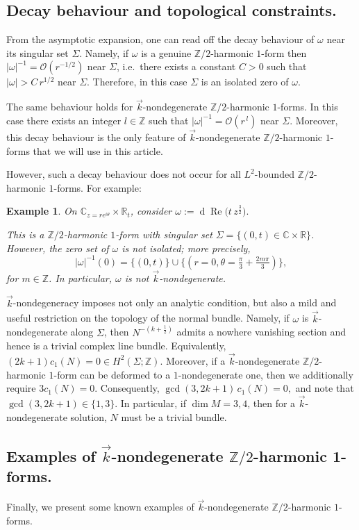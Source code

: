 \documentclass[11pt]{amsart}
\newcommand{\Z}{\mathbb{Z}}
\newcommand{\C}{\mathbb{C}}
\newcommand{\ZT}{\mathbb{Z}/2}
\renewcommand{\d}{\operatorname{d}}
\renewcommand{\O}{\mathcal{O}}
\renewcommand{\Re}{\operatorname{Re}}
\newtheorem{example}[theorem]{Example}
\newcommand{\mbR}{\mathbb{R}}
\begin{document}
\subsection{Decay behaviour and topological constraints.}
From the asymptotic expansion, one can read off the decay behaviour of $\omega$ near its singular set
$\Sigma$. Namely, if $\omega$ is a genuine $\ZT$-harmonic $1$-form then $|\omega|^{-1}=\O(r^{-1/2})$
near $\Sigma$, i.e.\ there exists a constant $C>0$ such that $|\omega|>C\,r^{1/2}$ near $\Sigma$.
Therefore, in this case $\Sigma$ is an isolated zero of $\omega$.

The same behaviour holds for $\vec{k}$-nondegenerate $\ZT$-harmonic $1$-forms. In this case there
exists an integer $l\in\Z$ such that $|\omega|^{-1}=\O(r^{\,l})$ near $\Sigma$. Moreover, this decay
behaviour is the only feature of $\vec{k}$-nondegenerate $\ZT$-harmonic $1$-forms that we will use in
this article.

However, such a decay behaviour does not occur for all $L^2$-bounded $\ZT$-harmonic $1$-forms. For
example:

\begin{example}
	On $\C_{z=re^{i\theta}}\times \mbR_t$, consider $\omega := \d\Re\bigl(t\,z^{\frac32}\bigr).$
	
	This is a $\ZT$-harmonic $1$-form with singular set $\Sigma=\{(0,t)\in \C\times \mbR\}$. However,
	the zero set of $\omega$ is not isolated; more precisely,
	\[
	|\omega|^{-1}(0)=\{(0,t)\}\cup \{(r=0,\theta=\tfrac{\pi}{3}+\tfrac{2m\pi}{3})\},
	\]
	for $m\in \Z$. In particular, $\omega$ is not $\vec{k}$-nondegenerate.
\end{example}

$\vec{k}$-nondegeneracy imposes not only an analytic condition, but also a mild and useful
restriction on the topology of the normal bundle. Namely, if $\omega$ is $\vec{k}$-nondegenerate
along $\Sigma$, then $N^{-(k+\frac12)}$ admits a nowhere vanishing section and hence is a trivial
complex line bundle. Equivalently, $(2k+1)c_1(N)=0\in H^2(\Sigma;\Z).$
Moreover, if a $\vec{k}$-nondegenerate $\ZT$-harmonic $1$-form can be deformed to a
$1$-nondegenerate one, then we additionally require $3c_1(N)=0$. Consequently, $\gcd(3,2k+1)\,c_1(N)=0,$
and note that $\gcd(3,2k+1)\in\{1,3\}$. In particular, if $\dim M=3,4$, then for a
$\vec{k}$-nondegenerate solution, $N$ must be a trivial bundle.

\subsection{Examples of \texorpdfstring{$\vec{k}$}{k}-nondegenerate \texorpdfstring{$\ZT$}{Z/2}-harmonic 1-forms.}
Finally, we present some known examples of $\vec{k}$-nondegenerate $\ZT$-harmonic $1$-forms.
\end{document}
